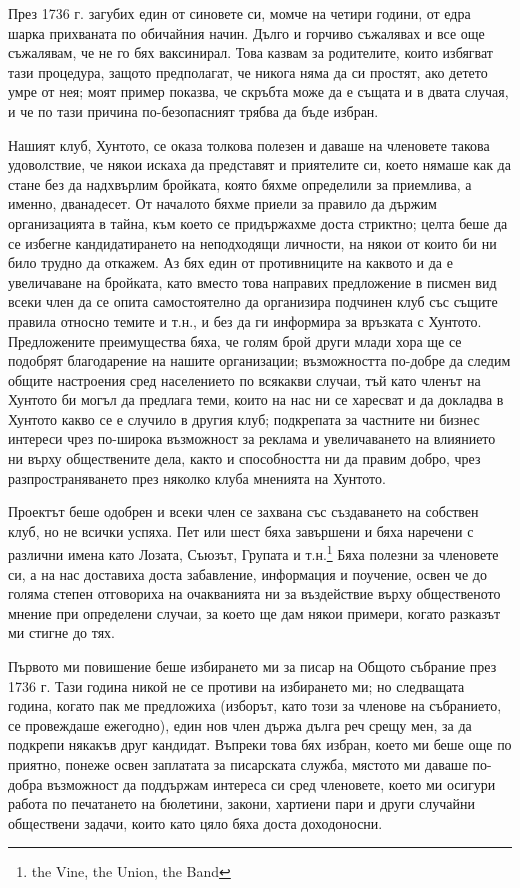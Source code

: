 \documentclass[12pt]{book}
\begin{document}
През 1736 г. загубих един от синовете си, момче на четири години, от едра шарка прихваната по обичайния начин. Дълго и горчиво съжалявах и все още съжалявам, че не го бях ваксинирал. Това казвам за родителите, които избягват тази процедура, защото предполагат, че никога няма да си простят, ако детето умре от нея; моят пример показва, че скръбта може да е същата и в двата случая, и че по тази причина по-безопасният трябва да бъде избран.

Нашият клуб, Хунтото, се оказа толкова полезен и даваше на членовете такова удоволствие, че някои искаха да представят и приятелите си, което нямаше как да стане без да надхвърлим бройката, която бяхме определили за приемлива, а именно, дванадесет. От началото бяхме приели за правило да държим организацията в тайна, към което се придържахме доста стриктно; целта беше да се избегне кандидатирането на неподходящи личности, на някои от които би ни било трудно да откажем. Аз бях един от противниците на каквото и да е увеличаване на бройката, като вместо това направих предложение в писмен вид всеки член да се опита самостоятелно да организира подчинен клуб със същите правила относно темите и т.н., и без да ги информира за връзката с Хунтото. Предложените преимущества бяха, че голям брой други млади хора ще се подобрят благодарение на нашите организации; възможността по-добре да следим общите настроения сред населението по всякакви случаи, тъй като членът на Хунтото би могъл да предлага теми, които на нас ни се харесват и да докладва в Хунтото какво се е случило в другия клуб; подкрепата за частните ни бизнес интереси чрез по-широка възможност за реклама и увеличаването на влиянието ни върху обществените дела, както и способността ни да правим добро, чрез разпространяването през няколко клуба мненията на Хунтото.

Проектът беше одобрен и всеки член се захвана със създаването на собствен клуб, но не всички успяха. Пет или шест бяха завършени и бяха наречени с различни имена като Лозата, Съюзът, Групата и т.н.\footnote{the Vine, the Union, the Band} Бяха полезни за членовете си, а на нас доставиха доста забавление, информация и поучение, освен че до голяма степен отговориха на очакванията ни за въздействие върху общественото мнение при определени случаи, за което ще дам някои примери, когато разказът ми стигне до тях.  

Първото ми повишение беше избирането ми за писар на Общото събрание през 1736 г. Тази година никой не се противи на избирането ми; но следващата година, когато пак ме предложиха (изборът, като този за членове на събранието, се провеждаше ежегодно), един нов член държа дълга реч срещу мен, за да подкрепи някакъв друг кандидат. Въпреки това бях избран, което ми беше още по приятно, понеже освен заплатата за писарската служба, мястото ми даваше по-добра възможност да поддържам интереса си сред членовете, което ми осигури работа по печатането на бюлетини, закони, хартиени пари и други случайни обществени задачи, които като цяло бяха доста доходоносни.
\end{document}
